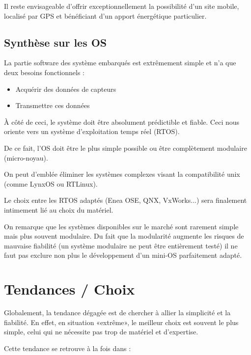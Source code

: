 \documentclass{mise_en_page}
\begin{document}
Il reste envisageable d’offrir exceptionnellement la possibilité d’un
site mobile, localisé par GPS et bénéficiant d’un apport énergétique
particulier.

\subsection{Synthèse sur les OS}
La partie software des système embarqués est extrêmement simple et n’a
que deux besoins fonctionnels :

\begin{itemize}
\item Acquérir des données de capteurs
\item Transmettre ces données
\end{itemize}
À côté de ceci, le système doit être absolument prédictible et fiable.
Ceci nous oriente vers un système d’exploitation temps réel (RTOS).

De ce fait, l’OS doit être le plus simple possible ou être complètement
modulaire (micro-noyau).

On peut d’emblée éliminer les systèmes complexes visant la compatibilité
unix (comme LynxOS ou RTLinux).

Le choix entre les RTOS adaptés (Enea OSE, QNX, VxWorks...) sera
finalement intimement lié au choix du matériel.

On remarque que les systèmes disponibles sur le marché sont rarement
simple mais plus souvent modulaire. Du fait que la modularité augmente
les risques de mauvaise fiabilité (un système modulaire ne peut être
entièrement testé) il ne faut pas exclure non plus le développement
d’un mini-OS parfaitement adapté.

\section{Tendances / Choix}
Globalement, la tendance dégagée est de chercher à allier la simplicité
et la fiabilité. En effet, en situation «extrême», le meilleur choix
est souvent le plus simple, celui qui ne nécessite pas trop de matériel
et d’expertise.

Cette tendance se retrouve à la fois dans :
\end{document}
